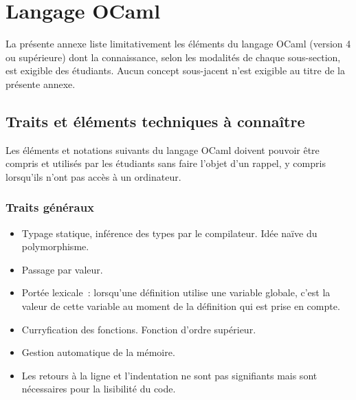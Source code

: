 \section{Langage OCaml}
La présente annexe liste limitativement les éléments du langage OCaml (version 4 ou supérieure) dont la connaissance, selon les modalités de chaque sous-section, est exigible des étudiants. Aucun concept sous-jacent n'est exigible au titre de la présente annexe.


\subsection{Traits et éléments techniques à connaître}
Les éléments et notations suivants du langage OCaml doivent pouvoir être compris et utilisés par les étudiants sans faire l'objet d'un rappel, y compris lorsqu'ils n'ont pas accès à un ordinateur.

\subsubsection*{Traits généraux}
\begin{itemize}
\item Typage statique, inférence des types par le compilateur. Idée naïve du polymorphisme.
\item Passage par valeur.
\item Portée lexicale~: lorsqu'une définition utilise une variable globale, c'est la valeur de cette variable au moment de la définition qui est prise en compte.
\item Curryfication des fonctions. Fonction d'ordre supérieur.
\item Gestion automatique de la mémoire.
\item Les retours à la ligne et l'indentation ne sont pas signifiants mais sont nécessaires pour la lisibilité du code.
\end{itemize}

